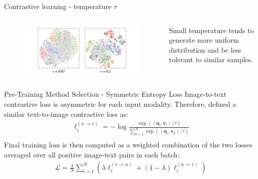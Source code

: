 \documentclass[aspectratio=169,xcolor=dvipsnames]{beamer}
\begin{document}
\begin{frame}{Contrastive learning - temperature $\tau$}
    \begin{columns}
        \begin{column}{0.6\textwidth}
            \begin{figure}
                \centering
                \includegraphics[width=1.1\linewidth]{figures/visualization _embedding_distribution.png}
                \label{visualization_embedding_distribution} 
            \end{figure}
        \end{column}
        \begin{column}{0.3\textwidth}
            Small temperature tends to generate
            more uniform distribution and be less tolerant to similar samples.
        \end{column}
    \end{columns}
\end{frame}


\begin{frame}{Pre-Training Method Selection - Symmetric Entropy Loss}
Image-to-text contrastive loss is asymmetric for each input modality. Therefore, defined a similar text-to-image contrastive loss as: \\
    \begin{align*}
        \ell_i^{(u \rightarrow v)}=-\log \frac{\exp \left(\left\langle\mathbf{u}_i, \mathbf{v}_i\right\rangle / \tau\right)}{\sum_{k=1}^N \exp \left(\left\langle\mathbf{u}_i, \mathbf{v}_k\right\rangle / \tau\right)} \\
    \end{align*}
Final training loss is then computed as a weighted combination of the two losses averaged over all positive image-text pairs in each batch:\\
    \begin{align*}
        \mathcal{L}=\frac{1}{N} \sum_{i=1}^N\left(\lambda \ell_i^{(v \rightarrow u)}+(1-\lambda) \ell_i^{(u \rightarrow v)}\right)
    \end{align*}
\end{frame}
\end{document}
